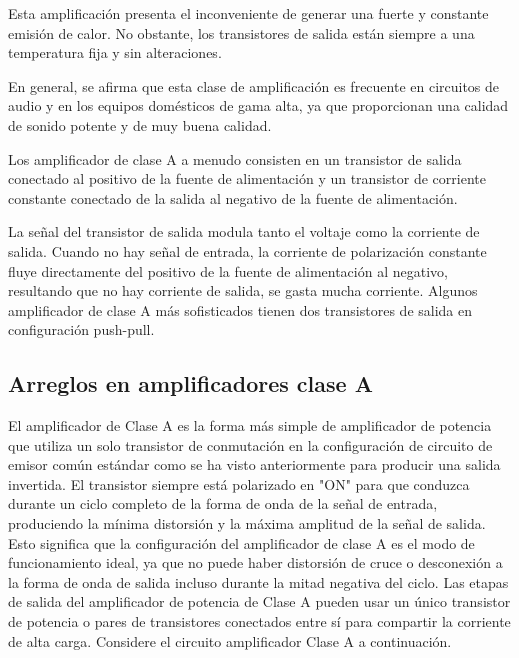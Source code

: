 \documentclass[12pt,a4paper]{article}
\begin{document}
\begin{flushleft}
Esta amplificación presenta el inconveniente de generar una fuerte y constante emisión de calor. No obstante, los transistores de salida están siempre a una temperatura fija y sin alteraciones.\linebreak

En general, se afirma que esta clase de amplificación es frecuente en circuitos de audio y en los equipos domésticos de gama alta, ya que proporcionan una calidad de sonido potente y de muy buena calidad.\linebreak

Los amplificador de clase A a menudo consisten en un transistor de salida conectado al positivo de la fuente de alimentación y un transistor de corriente constante conectado de la salida al negativo de la fuente de alimentación.\linebreak

La señal del transistor de salida modula tanto el voltaje como la corriente de salida. Cuando no hay señal de entrada, la corriente de polarización constante fluye directamente del positivo de la fuente de alimentación al negativo, resultando que no hay corriente de salida, se gasta mucha corriente. Algunos amplificador de clase A más sofisticados tienen dos transistores de salida en configuración push-pull.\newpage
\end{flushleft}
\begin{center}
\section {Arreglos en amplificadores clase A}
\end{center}
El amplificador de Clase A es la forma más simple de amplificador de potencia que utiliza un solo transistor de conmutación en la configuración de circuito de emisor común estándar como se ha visto anteriormente para producir una salida invertida. El transistor siempre está polarizado en "ON" para que conduzca durante un ciclo completo de la forma de onda de la señal de entrada, produciendo la mínima distorsión y la máxima amplitud de la señal de salida.\linebreak
Esto significa que la configuración del amplificador de clase A es el modo de funcionamiento ideal, ya que no puede haber distorsión de cruce o desconexión a la forma de onda de salida incluso durante la mitad negativa del ciclo. Las etapas de salida del amplificador de potencia de Clase A pueden usar un único transistor de potencia o pares de transistores conectados entre sí para compartir la corriente de alta carga. Considere el circuito amplificador Clase A a continuación.\\
\end{document}
